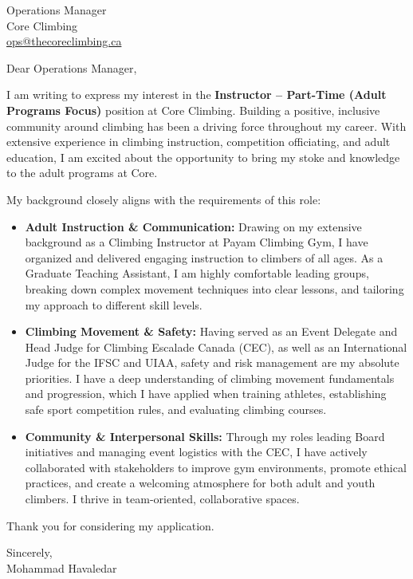 \documentclass[11pt]{letter}
\begin{document}
\begin{letter}{Operations Manager \\ Core Climbing \\ \href{mailto:ops@thecoreclimbing.ca}{ops@thecoreclimbing.ca}}

    \opening{Dear Operations Manager,}

    I am writing to express my interest in the \textbf{Instructor – Part-Time (Adult Programs Focus)} position at Core Climbing. Building a positive, inclusive community around climbing has been a driving force throughout my career. With extensive experience in climbing instruction, competition officiating, and adult education, I am excited about the opportunity to bring my stoke and knowledge to the adult programs at Core.

    My background closely aligns with the requirements of this role:

    \begin{itemize}
        \item \textbf{Adult Instruction \& Communication:} Drawing on my extensive background as a Climbing Instructor at Payam Climbing Gym, I have organized and delivered engaging instruction to climbers of all ages. As a Graduate Teaching Assistant, I am highly comfortable leading groups, breaking down complex movement techniques into clear lessons, and tailoring my approach to different skill levels.
        \item \textbf{Climbing Movement \& Safety:} Having served as an Event Delegate and Head Judge for Climbing Escalade Canada (CEC), as well as an International Judge for the IFSC and UIAA, safety and risk management are my absolute priorities. I have a deep understanding of climbing movement fundamentals and progression, which I have applied when training athletes, establishing safe sport competition rules, and evaluating climbing courses.
        \item \textbf{Community \& Interpersonal Skills:} Through my roles leading Board initiatives and managing event logistics with the CEC, I have actively collaborated with stakeholders to improve gym environments, promote ethical practices, and create a welcoming atmosphere for both adult and youth climbers. I thrive in team-oriented, collaborative spaces.
    \end{itemize}

    Thank you for considering my application.

    Sincerely, \\ Mohammad Havaledar

\end{letter}
\end{document}
